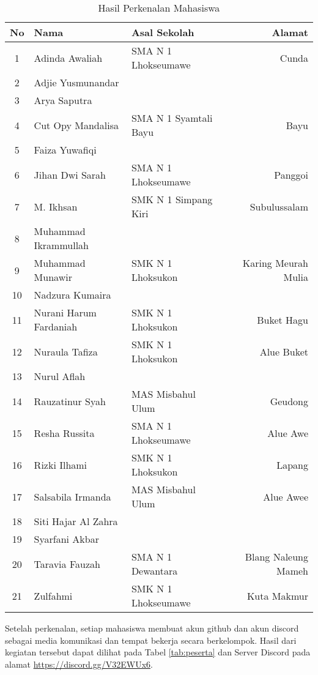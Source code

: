 \documentclass[a4paper]{tufte-handout}
\begin{document}
\begin{table}[!ht]
\vspace*{.5cm}
\caption{Hasil Perkenalan Mahasiswa}
\label{tab:perkenalan}
\centering
\begin{tabular}{cllr} 
\toprule
No & Nama 					& Asal Sekolah 			& Alamat\\
\midrule
1 & Adinda Awaliah			& SMA N 1 Lhokseumawe 	& Cunda \\
2 & Adjie Yusmunandar		& & \\
3 & Arya Saputra			& & \\
4 & Cut Opy Mandalisa		& SMA N 1 Syamtali Bayu	& Bayu \\
5 & Faiza Yuwafiqi			& & \\
6 & Jihan Dwi Sarah			& SMA N 1 Lhokseumawe 	& Panggoi \\
7 & M. Ikhsan				& SMK N 1 Simpang Kiri 	& Subulussalam \\
\midrule
8 & Muhammad Ikrammullah	& & \\
9 & Muhammad Munawir		& SMK N 1 Lhoksukon		& Karing Meurah Mulia \\
10 & Nadzura Kumaira		& & \\
11 & Nurani Harum Fardaniah	& SMK N 1 Lhoksukon 	& Buket Hagu \\
12 & Nuraula Tafiza			& SMK N 1 Lhoksukon & Alue Buket \\
13 & Nurul Aflah			& & \\
14 & Rauzatinur Syah		& MAS Misbahul Ulum 	& Geudong \\
\midrule
15 & Resha Russita			& SMA N 1 Lhokseumawe 	& Alue Awe \\
16 & Rizki Ilhami			& SMK N 1 Lhoksukon 	& Lapang \\
17 & Salsabila Irmanda		& MAS Misbahul Ulum 	& Alue Awee \\
18 & Siti Hajar Al Zahra	& & \\
19 & Syarfani Akbar			& & \\
20 & Taravia Fauzah			& SMA N 1 Dewantara 	& Blang Naleung Mameh \\
21 & Zulfahmi				& SMK N 1 Lhokseumawe	& Kuta Makmur \\
\bottomrule
\end{tabular}
\end{table}

Setelah perkenalan, setiap mahasiswa membuat akun github dan akun discord sebagai media komunikasi dan tempat bekerja secara berkelompok. Hasil dari kegiatan tersebut dapat dilihat pada Tabel \ref{tab:peserta} dan Server Discord pada alamat \url{https://discord.gg/V32EWUx6}.
\end{document}
